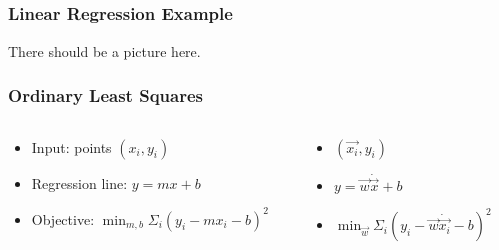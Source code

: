 
\newcommand\here{lalala}


\subsection{}
\begin{frame}
  \frametitle{Linear Regression Example}
  There should be a picture here.

\end{frame}



\begin{frame}
\frametitle{Ordinary Least Squares}

\begin{columns}
  \begin{column}{0.5\textwidth}
    \begin{itemize}
    \item[] Input: points $(x_i, y_i)$
      \item[] Regression line: $y = mx + b$
\item[] Objective: $\min_{m, b}\Sigma_{i}(y_i - mx_i -b)^2$
    \end{itemize}
  \end{column}

  \begin{column}{0.5\textwidth}
    \begin{itemize}
    \item[] $(\vec{x_i}, y_i)$
    \item[] $y = \vec{w}\dot\vec{x} + b$
    \item[] $\min_{\vec{w}}\Sigma_{i}(y_i - \vec{w}\dot\vec{x_i} -b)^2$
    \end{itemize}

  \end{column}
\end{columns}
\end{frame}
